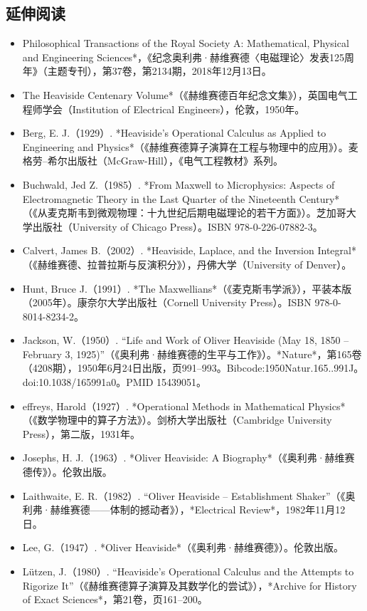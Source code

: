 \subsection{延伸阅读}
\begin{itemize}
\item Philosophical Transactions of the Royal Society A: Mathematical, Physical and Engineering Sciences*，《纪念奥利弗·赫维赛德〈电磁理论〉发表125周年》（主题专刊），第37卷，第2134期，2018年12月13日。
\item The Heaviside Centenary Volume*（《赫维赛德百年纪念文集》），英国电气工程师学会（Institution of Electrical Engineers），伦敦，1950年。
\item Berg, E. J.（1929）. *Heaviside’s Operational Calculus as Applied to Engineering and Physics*（《赫维赛德算子演算在工程与物理中的应用》）。麦格劳–希尔出版社（McGraw-Hill），《电气工程教材》系列。
\item Buchwald, Jed Z.（1985）. *From Maxwell to Microphysics: Aspects of Electromagnetic Theory in the Last Quarter of the Nineteenth Century*（《从麦克斯韦到微观物理：十九世纪后期电磁理论的若干方面》）。芝加哥大学出版社（University of Chicago Press）。ISBN 978-0-226-07882-3。
\item Calvert, James B.（2002）. *Heaviside, Laplace, and the Inversion Integral*（《赫维赛德、拉普拉斯与反演积分》），丹佛大学（University of Denver）。
\item Hunt, Bruce J.（1991）. *The Maxwellians*（《麦克斯韦学派》），平装本版（2005年）。康奈尔大学出版社（Cornell University Press）。ISBN 978-0-8014-8234-2。
\item Jackson, W.（1950）. “Life and Work of Oliver Heaviside (May 18, 1850 – February 3, 1925)”（《奥利弗·赫维赛德的生平与工作》）。*Nature*，第165卷（4208期），1950年6月24日出版，页991–993。Bibcode:1950Natur.165..991J。doi:10.1038/165991a0。PMID 15439051。
\item effreys, Harold（1927）. *Operational Methods in Mathematical Physics*（《数学物理中的算子方法》）。剑桥大学出版社（Cambridge University Press），第二版，1931年。
\item Josephs, H. J.（1963）. *Oliver Heaviside: A Biography*（《奥利弗·赫维赛德传》）。伦敦出版。
\item Laithwaite, E. R.（1982）. “Oliver Heaviside – Establishment Shaker”（《奥利弗·赫维赛德——体制的撼动者》），*Electrical Review*，1982年11月12日。
\item Lee, G.（1947）. *Oliver Heaviside*（《奥利弗·赫维赛德》）。伦敦出版。
\item Lützen, J.（1980）. “Heaviside’s Operational Calculus and the Attempts to Rigorize It”（《赫维赛德算子演算及其数学化的尝试》），*Archive for History of Exact Sciences*，第21卷，页161–200。

\end{itemize}
